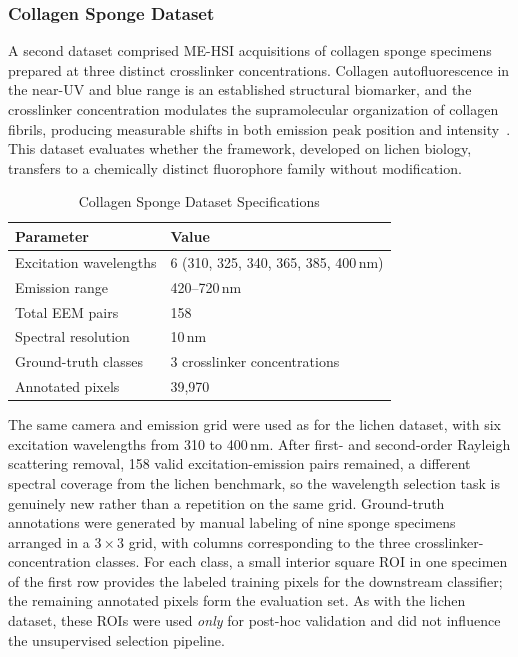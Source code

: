 \subsubsection{Collagen Sponge Dataset}
\label{sec:dataset_collagen}

A second dataset comprised ME-HSI acquisitions of collagen sponge specimens prepared at three distinct crosslinker concentrations.
Collagen autofluorescence in the near-UV and blue range is an established structural biomarker, and the crosslinker concentration modulates the supramolecular organization of collagen fibrils, producing measurable shifts in both emission peak position and intensity~\cite{lakowicz2006principles}.
This dataset evaluates whether the framework, developed on lichen biology, transfers to a chemically distinct fluorophore family without modification.

\begin{table}[!t]
\centering
\caption{Collagen Sponge Dataset Specifications}
\label{tab:dataset_collagen}
\begin{tabular}{@{}ll@{}}
\toprule
\textbf{Parameter} & \textbf{Value} \\
\midrule
Excitation wavelengths & 6 (310, 325, 340, 365, 385, 400\,nm) \\
Emission range & 420--720\,nm \\
Total EEM pairs & 158 \\
Spectral resolution & 10\,nm \\
Ground-truth classes & 3 crosslinker concentrations \\
Annotated pixels & 39{,}970 \\
\bottomrule
\end{tabular}
\end{table}

The same camera and emission grid were used as for the lichen dataset, with six excitation wavelengths from 310 to 400\,nm. After first- and second-order Rayleigh scattering removal, 158 valid excitation-emission pairs remained, a different spectral coverage from the lichen benchmark, so the wavelength selection task is genuinely new rather than a repetition on the same grid.
Ground-truth annotations were generated by manual labeling of nine sponge specimens arranged in a $3 \times 3$ grid, with columns corresponding to the three crosslinker-concentration classes.
For each class, a small interior square ROI in one specimen of the first row provides the labeled training pixels for the downstream classifier; the remaining annotated pixels form the evaluation set.
As with the lichen dataset, these ROIs were used \emph{only} for post-hoc validation and did not influence the unsupervised selection pipeline.

